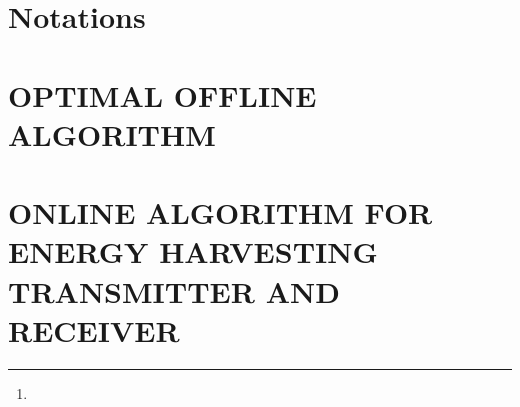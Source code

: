 \documentclass[10pt,twocolumn,twoside]{IEEEtran}
\title{}
\author{
\thanks{}
}
\begin{document}
\maketitle
\thispagestyle{empty}
\pagestyle{empty}
\begin{abstract}
\end{abstract}


\begin{IEEEkeywords}
\end{IEEEkeywords}

\section{Notations}


\section{OPTIMAL OFFLINE ALGORITHM}




\section{ONLINE ALGORITHM FOR ENERGY HARVESTING TRANSMITTER AND RECEIVER}


\appendices


 
\end{document}
